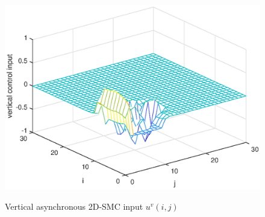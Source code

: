 \documentclass[conference]{IEEEtran}
\begin{document}
\begin{figure}[!htb]
	\centering\includegraphics[scale=0.6]{./simulations/v-controll-input_eps.eps}\\ 
	\caption{Vertical asynchronous 2D-SMC input $u^{v}(i,j)$}
	\label{fig8}
\end{figure}
\end{document}
